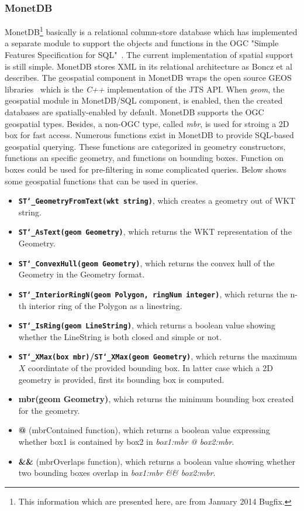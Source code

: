 \documentclass[a4paper,12pt]{article}
\begin{document}
\subsubsection{MonetDB}
MonetDB\footnote{This information which are presented here, are from January 2014 Bugfix.} basically is a relational column-store database which has implemented a separate module to support the objects and functions in the OGC "Simple Features Specification for SQL"~\cite{ogcsfs}. The current implementation of spatial support is still simple. MonetDB stores XML in its relational architecture as Boncz et al~\cite{Boncz2006} describes. The geospatial component in MonetDB wraps the open source GEOS libraries~\cite{GEOS}
which is the \textit{C++} implementation of the JTS API. When \textit{geom}, the geospatial module in MonetDB/SQL component, is enabled, then the created databases are spatially-enabled by default. MonetDB supports the OGC geospatial types. Besides, a non-OGC type, called \textit{mbr}, is used for stroing a 2D box for fast access. Numerous functions exist in MonetDB to provide SQL-based geospatial querying. These functions are categorized in geometry constructors, functions an specific geometry, and functions on bounding boxes. Function on boxes could be used for pre-filtering in some complicated queries. Below shows some geospatial functions that can be used in queries.
\begin{itemize}
\item \textbf{\texttt{ST\char`_GeometryFromText(wkt string)}}, which creates a geometry out of WKT string.
\item \textbf{\texttt{ST\char`_AsText(geom Geometry)}}, which returns the WKT representation of the Geometry.
\item \textbf{\texttt{ST\char`_ConvexHull(geom Geometry)}}, which returns the convex hull of the Geometry in the Geometry format.
\item \textbf{\texttt{ST\char`_InteriorRingN(geom Polygon, ringNum integer)}}, which returns the n-th interior ring of the Polygon as a linestring.
\item \textbf{\texttt{ST\char`_IsRing(geom LineString)}}, which returns a boolean value showing whether the LineString is both closed and simple or not.
\item \textbf{\texttt{ST\char`_XMax(box mbr)}/\texttt{ST\char`_XMax(geom Geometry)}}, which returns the maximum $X$ coordintate of the provided bounding box. In latter case which a 2D geometry is provided, first its bounding box is computed.
\item \textbf{mbr(geom Geometry)}, which returns the minimum bounding box created for the geometry.
\item \textbf{@} (mbrContained function), which returns a boolean value expressing whether box1 is contained by box2 in \textit{box1:mbr @ box2:mbr}.
\item \textbf{\&\&} (mbrOverlaps function), which returns a boolean value showing whether two bounding boxes overlap in \textit{box1:mbr \&\& box2:mbr}.

\end{itemize}
\end{document}
